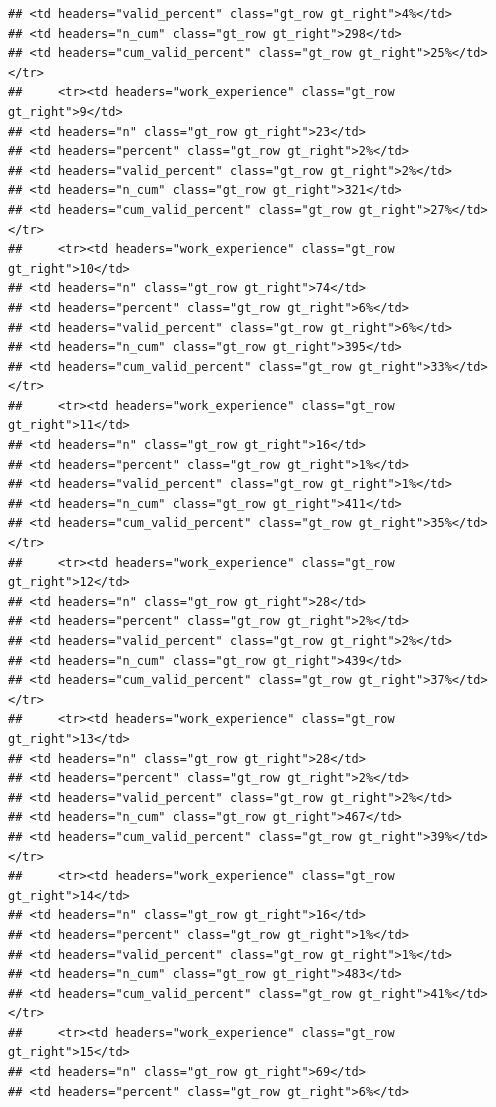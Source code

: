\documentclass[
  a4paper,
  DIV=11,
  numbers=noendperiod]{scrartcl}
\begin{document}
\begin{verbatim}
## <td headers="valid_percent" class="gt_row gt_right">4%</td>
## <td headers="n_cum" class="gt_row gt_right">298</td>
## <td headers="cum_valid_percent" class="gt_row gt_right">25%</td></tr>
##     <tr><td headers="work_experience" class="gt_row gt_right">9</td>
## <td headers="n" class="gt_row gt_right">23</td>
## <td headers="percent" class="gt_row gt_right">2%</td>
## <td headers="valid_percent" class="gt_row gt_right">2%</td>
## <td headers="n_cum" class="gt_row gt_right">321</td>
## <td headers="cum_valid_percent" class="gt_row gt_right">27%</td></tr>
##     <tr><td headers="work_experience" class="gt_row gt_right">10</td>
## <td headers="n" class="gt_row gt_right">74</td>
## <td headers="percent" class="gt_row gt_right">6%</td>
## <td headers="valid_percent" class="gt_row gt_right">6%</td>
## <td headers="n_cum" class="gt_row gt_right">395</td>
## <td headers="cum_valid_percent" class="gt_row gt_right">33%</td></tr>
##     <tr><td headers="work_experience" class="gt_row gt_right">11</td>
## <td headers="n" class="gt_row gt_right">16</td>
## <td headers="percent" class="gt_row gt_right">1%</td>
## <td headers="valid_percent" class="gt_row gt_right">1%</td>
## <td headers="n_cum" class="gt_row gt_right">411</td>
## <td headers="cum_valid_percent" class="gt_row gt_right">35%</td></tr>
##     <tr><td headers="work_experience" class="gt_row gt_right">12</td>
## <td headers="n" class="gt_row gt_right">28</td>
## <td headers="percent" class="gt_row gt_right">2%</td>
## <td headers="valid_percent" class="gt_row gt_right">2%</td>
## <td headers="n_cum" class="gt_row gt_right">439</td>
## <td headers="cum_valid_percent" class="gt_row gt_right">37%</td></tr>
##     <tr><td headers="work_experience" class="gt_row gt_right">13</td>
## <td headers="n" class="gt_row gt_right">28</td>
## <td headers="percent" class="gt_row gt_right">2%</td>
## <td headers="valid_percent" class="gt_row gt_right">2%</td>
## <td headers="n_cum" class="gt_row gt_right">467</td>
## <td headers="cum_valid_percent" class="gt_row gt_right">39%</td></tr>
##     <tr><td headers="work_experience" class="gt_row gt_right">14</td>
## <td headers="n" class="gt_row gt_right">16</td>
## <td headers="percent" class="gt_row gt_right">1%</td>
## <td headers="valid_percent" class="gt_row gt_right">1%</td>
## <td headers="n_cum" class="gt_row gt_right">483</td>
## <td headers="cum_valid_percent" class="gt_row gt_right">41%</td></tr>
##     <tr><td headers="work_experience" class="gt_row gt_right">15</td>
## <td headers="n" class="gt_row gt_right">69</td>
## <td headers="percent" class="gt_row gt_right">6%</td>

\end{verbatim}
\end{document}
